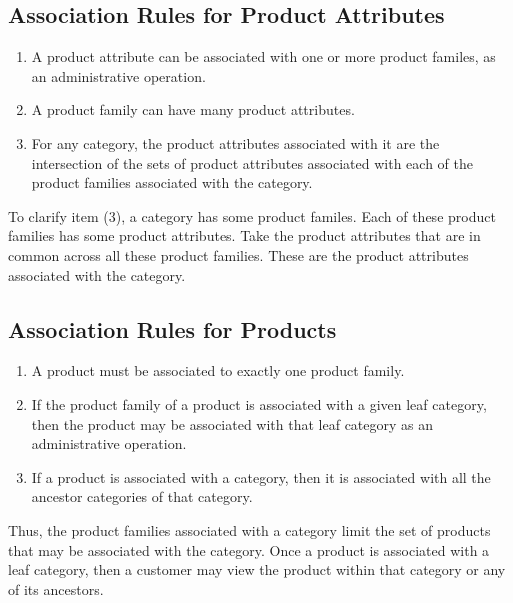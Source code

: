 \documentclass[letterpaper, 12pt]{article}
\begin{document}
\subsection{Association Rules for Product Attributes}
\begin{enumerate}
\item A product attribute can be associated with one or more product familes, as an administrative operation.
\item A product family can have many product attributes.
\item For any category, the product attributes associated with it are the intersection of the sets of product attributes associated with each of the product families associated with the category.  

\end{enumerate}

To clarify item (3), a category has some product familes.  Each of these product families has some product attributes.  Take the product attributes that are in common across all these product families.  These are the product attributes associated with the category.

\subsection{Association Rules for Products}
\begin{enumerate}
\item A product must be associated to exactly one product family.
\item If the product family of a product is associated with a given leaf category, then the product may be associated with that leaf category as an administrative operation.
\item If a product is associated with a category, then it is associated with all the ancestor categories of that category.
\end{enumerate}

Thus, the product families associated with a category limit the set of products that may be associated with the category.  Once a product is associated with a leaf category, then a customer may view the product within that category or any of its ancestors.
\end{document}

